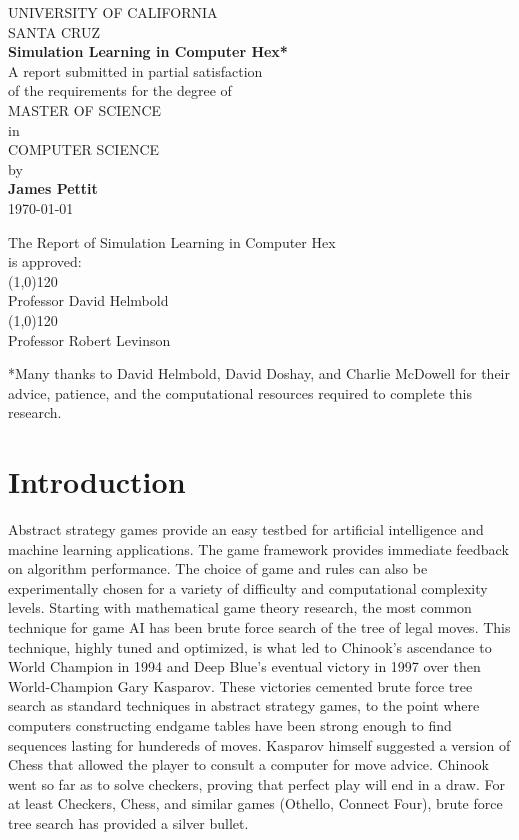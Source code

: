 \documentclass[10pt,a4paper]{report}
\begin{document}
\begin{titlepage}
\begin{center}
UNIVERSITY OF CALIFORNIA\\[0.5cm]
SANTA CRUZ\\[0.75cm]
\textbf{Simulation Learning in Computer Hex*}\\[0.5cm]
\small{A report submitted in partial satisfaction}\\
\small{of the requirements for the degree of}\\[0.5cm]
MASTER OF SCIENCE\\[0.5cm]
in\\[0.5cm]
COMPUTER SCIENCE\\[0.5cm]
by\\[0.5cm]
\textbf{James Pettit}\\[0.5cm]
\today
\end{center}
\vfill
\begin{flushright}
The Report of Simulation Learning in Computer Hex\\
is approved:\\[1cm]
\line(1,0){120}\\
Professor David Helmbold\\[1cm]
\line(1,0){120}\\
Professor Robert Levinson\\[3cm]
\end{flushright}
\small{*Many thanks to David Helmbold, David Doshay, and Charlie McDowell for their advice, patience, and the computational resources required to complete this research.}
\end{titlepage}

\tableofcontents

\chapter{Introduction}
Abstract strategy games provide an easy testbed for artificial intelligence and machine learning applications. The game framework provides immediate feedback on algorithm performance. The choice of game and rules can also be experimentally chosen for a variety of difficulty and computational complexity levels. Starting with mathematical game theory research, the most common technique for game AI has been brute force search of the tree of legal moves. This technique, highly tuned and optimized, is what led to Chinook's ascendance to World Champion in 1994 and Deep Blue's eventual victory in 1997 over then World-Champion Gary Kasparov. These victories cemented brute force tree search as standard techniques in abstract strategy games, to the point where computers constructing endgame tables have been strong enough to find sequences lasting for hundereds of moves. Kasparov himself suggested a version of Chess that allowed the player to consult a computer for move advice. Chinook went so far as to solve checkers, proving that perfect play will end in a draw. For at least Checkers, Chess, and similar games (Othello, Connect Four), brute force tree search has provided a silver bullet.
\end{document}
